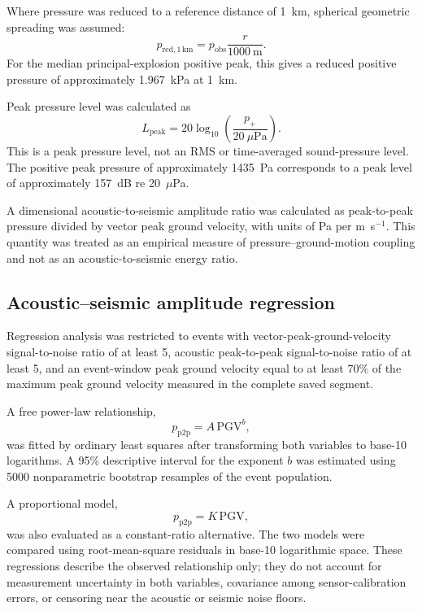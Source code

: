 \documentclass[]{seismica}
\begin{document}
Where pressure was reduced to a reference distance of 1~km, spherical geometric spreading was assumed:
\begin{equation}
  p_{\mathrm{red},1\,\mathrm{km}} = p_{\mathrm{obs}}\frac{r}{1000~\mathrm{m}}.
  \label{eq:reduced_pressure}
\end{equation}
For the median principal-explosion positive peak, this gives a reduced positive
pressure of approximately 1.967~kPa at 1~km.

Peak pressure level was calculated as
\begin{equation}
  L_{\mathrm{peak}} = 20\log_{10}\left(\frac{p_+}{20~\mu\mathrm{Pa}}\right).
  \label{eq:peak_pressure_level}
\end{equation}
This is a peak pressure level, not an RMS or time-averaged sound-pressure level. The positive peak pressure of approximately 1435~Pa corresponds to a peak level of approximately 157~dB re 20~$\mu$Pa.

A dimensional acoustic-to-seismic amplitude ratio was calculated as peak-to-peak pressure divided by vector peak ground velocity, with units of Pa per m~s$^{-1}$. This quantity was treated as an empirical measure of pressure--ground-motion coupling and not as an acoustic-to-seismic energy ratio.

\subsection{Acoustic--seismic amplitude regression}

Regression analysis was restricted to events with vector-peak-ground-velocity signal-to-noise ratio of at least 5, acoustic peak-to-peak signal-to-noise ratio of at least 5, and an event-window peak ground velocity equal to at least 70\% of the maximum peak ground velocity measured in the complete saved segment.

A free power-law relationship,
\begin{equation}
  p_{\mathrm{p2p}} = A\,\mathrm{PGV}^{b},
  \label{eq:power_law}
\end{equation}
was fitted by ordinary least squares after transforming both variables to base-10 logarithms. A 95\% descriptive interval for the exponent $b$ was estimated using 5000 nonparametric bootstrap resamples of the event population.

A proportional model,
\begin{equation}
  p_{\mathrm{p2p}} = K\,\mathrm{PGV},
  \label{eq:proportional_model}
\end{equation}
was also evaluated as a constant-ratio alternative. The two models were compared using root-mean-square residuals in base-10 logarithmic space. These regressions describe the observed relationship only; they do not account for measurement uncertainty in both variables, covariance among sensor-calibration errors, or censoring near the acoustic or seismic noise floors.
\end{document}
